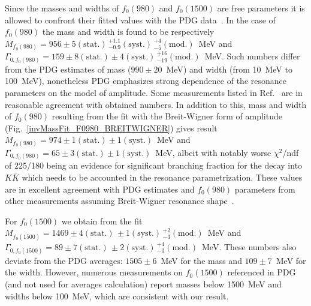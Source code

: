 %
%
Since the masses and widths of $f_0(980)$ and $f_0(1500)$ are free parameters it is allowed to confront their fitted values with the PDG data~\cite{pdg}. In the case of $f_0(980)$ the mass and width is found to be respectively $M_{f_0(980)}=956 \pm 5 (\text{stat.})\,^{+1.1}_{-0.9} (\text{syst.})\,^{+4}_{-5} (\text{mod.})$~MeV and $\Gamma_{0,f_0(980)} = 159 \pm 8 (\text{stat.}) \pm 4 (\text{syst.})\,^{+16}_{-19} (\text{mod.})$~MeV. Such numbers differ from the PDG estimates of mass ($990 \pm 20$~MeV) and width (from 10~MeV to 100~MeV), nonetheless PDG emphasizes strong dependence of the resonance parameters on the model of amplitude. Some measurements listed in Ref.~\cite{pdg} are in reasonable agreement with obtained numbers. In addition to this, mass and width of $f_0(980)$ resulting from the fit with the Breit-Wigner form of amplitude (Fig.~\ref{invMassFit_F0980_BREITWIGNER}) gives result $M_{f_0(980)}=974 \pm 1 (\text{stat.}) \pm 1 (\text{syst.})$~MeV and $\Gamma_{0,f_0(980)} = 65 \pm 3 (\text{stat.}) \pm 1 (\text{syst.})$~MeV, albeit with notably worse $\chi^{2}$/ndf of 225/180 being an evidence for significant  branching fraction for the decay into $K\bar{K}$ which needs to be accounted in the resonance parametrization. These values are in excellent agreement with PDG estimates and $f_0(980)$ parameters from other measurements assuming Breit-Wigner resonance shape~\cite{pdg}.

For $f_0(1500)$ we obtain from the fit $M_{f_0(1500)}=1469 \pm 4 (\text{stat.})\,\pm 1 (\text{syst.})\,^{+2}_{-3} (\text{mod.})$~MeV and $\Gamma_{0,f_0(1500)} = 89 \pm 7 (\text{stat.})\,\pm 2 (\text{syst.})\,^{+4}_{-3} (\text{mod.})$~MeV. These numbers also deviate from the PDG averages: $1505\pm 6$~MeV for the mass and $109\pm 7$~MeV for the width. However, numerous measurements on $f_{0}(1500)$ referenced in PDG (and not used for averages calculation) report masses below 1500~MeV and widths below 100~MeV, which are consistent with our result.

%

